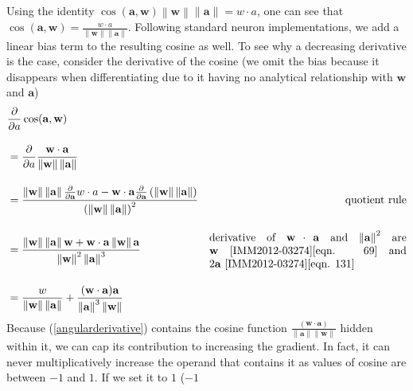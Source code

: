 Using the identity $\cos(\mathbf{a}, \mathbf{w}) \left\| \mathbf{w} \right\| \left\| \mathbf{a}
\right\| = w \cdot a$, one can see that $\cos(\mathbf{a}, \mathbf{w}) = \frac{w \cdot a}{\left\|
\mathbf{w} \right\| \left\| \mathbf{a} \right\|}$. Following standard neuron implementations, we add
a linear bias term to the resulting cosine as well. To see why a decreasing derivative is the case,
consider the derivative of the cosine (we omit the bias because it disappears when differentiating
due to it having no analytical relationship with $\mathbf{w}$ and $\mathbf{a}$)
\begin{align}
    &\frac{\partial}{\partial a} \cos(\mathbf{a}, \mathbf{w}) \notag \\[10pt]
    &= \frac{\partial}{\partial a} \frac{\mathbf{w} \cdot \mathbf{a}}{\left\| \mathbf{w} \right\| \left\| \mathbf{a} \right\|} \notag \\[10pt]
    &= \frac{
        \left\| \mathbf{w} \right\| \left\| \mathbf{a} \right\| \frac{\partial}{\partial \mathbf{a}} w \cdot a     -    \mathbf{w} \cdot \mathbf{a} \frac{\partial}{\partial \mathbf{a}} \left( \left\| \mathbf{w} \right\| \left\| \mathbf{a} \right\| \right) 
    }{
        \left(   \left\| \mathbf{w} \right\| \left\| \mathbf{a} \right\|   \right)^2
    } & \text{quotient rule} \notag \\[10pt]
    &= \frac{
        \left\| \mathbf{w} \right\|   \left\| \mathbf{a} \right\|   \mathbf{w}      +      \mathbf{w} \cdot \mathbf{a}   \left\| \mathbf{w} \right\|   \mathbf{a}
    }{
        \left\| \mathbf{w} \right\|^2 \left\| \mathbf{a} \right\|^3
    } & \text{\protect\parbox{2.5in}{derivative of $\mathbf{w} \cdot \mathbf{a}$ and $\left\| \mathbf{a} \right\|^2$ are $\mathbf{w}$~\cite{IMM2012-03274}[eqn. 69] and $2 \mathbf{a}$~\cite{IMM2012-03274}[eqn. 131]}} \notag \\[10pt]
    &= \frac{
                w
    }{
        \left\| \mathbf{w} \right\| \left\| \mathbf{a} \right\|
    }   +   \frac{
                    (\mathbf{w} \cdot \mathbf{a}) \mathbf{a}
            }{
                    \left\| \mathbf{a} \right\|^3   \left\| \mathbf{w} \right\|
            }
    \label{angularderivative}
\end{align}
Because (\ref{angularderivative}) contains the cosine function $\frac{ (\mathbf{w} \cdot
\mathbf{a}) } { \left\| \mathbf{a} \right\|   \left\| \mathbf{w} \right\| }$ hidden within it, we
can cap its contribution to increasing the gradient. In fact, it can never multiplicatively increase
the operand that contains it as values of cosine are between $-1$ and $1$. If we set it to $1$ ($-1$
